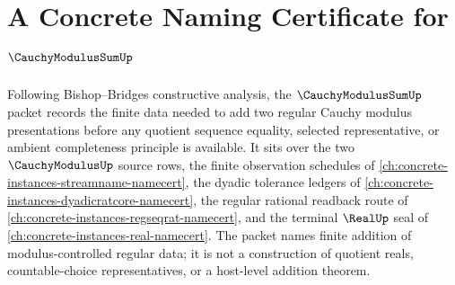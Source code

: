 \chapter{A Concrete Naming Certificate for $\CauchyModulusSumUp$}
\label{ch:concrete-instances-cauchy-modulus-sum-namecert}

Following Bishop--Bridges constructive analysis, the $\CauchyModulusSumUp$ packet records the finite data needed to add two regular Cauchy modulus presentations before any quotient sequence equality, selected representative, or ambient completeness principle is available. It sits over the two $\CauchyModulusUp$ source rows, the finite observation schedules of \autoref{ch:concrete-instances-streamname-namecert}, the dyadic tolerance ledgers of \autoref{ch:concrete-instances-dyadicratcore-namecert}, the regular rational readback route of \autoref{ch:concrete-instances-regseqrat-namecert}, and the terminal $\RealUp$ seal of \autoref{ch:concrete-instances-real-namecert}. The packet names finite addition of modulus-controlled regular data; it is not a construction of quotient reals, countable-choice representatives, or a host-level addition theorem.

